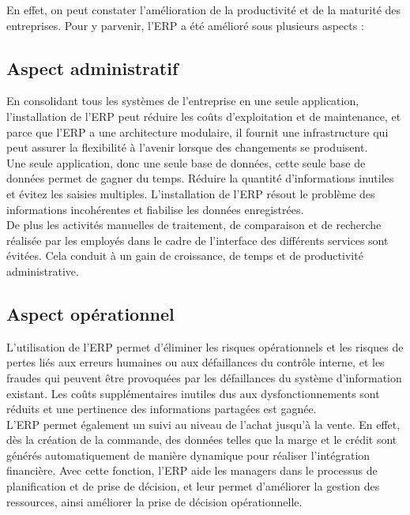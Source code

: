 En effet, on peut constater l'amélioration de la productivité et de la maturité des entreprises. Pour y parvenir, l'\acs{ERP} a été amélioré sous plusieurs aspects\cite{aspects} : \\

\subsection{Aspect administratif}
En consolidant tous les systèmes de l'entreprise en une seule application, l'installation de l'\acs{ERP} peut réduire les coûts d'exploitation et de maintenance, et parce que l'\acs{ERP} a une architecture modulaire, il fournit une infrastructure qui peut assurer la flexibilité à l'avenir lorsque des changements se produisent.\\

Une seule application, donc une seule base de données, cette seule base de données permet de gagner du temps. Réduire la quantité d'informations inutiles et évitez les saisies multiples. L'installation de l'\acs{ERP} résout le problème des informations incohérentes et fiabilise les données enregistrées.\\

De plus les activités manuelles de traitement, de comparaison et de recherche réalisée par les employés dans le cadre de l'interface des différents services sont évitées. Cela conduit à un gain de croissance, de temps et de productivité administrative.\\ 

\subsection{Aspect opérationnel}
L'utilisation de l'\acs{ERP} permet d'éliminer les risques opérationnels et les risques de pertes liés aux erreurs humaines ou aux défaillances du contrôle interne, et les fraudes qui peuvent être provoquées par les défaillances du système d'information existant. Les coûts supplémentaires inutiles dus aux dysfonctionnements sont réduits et une pertinence des informations partagées est gagnée.\\

L'\acs{ERP} permet également un suivi au niveau de l'achat jusqu'à la vente. En effet, dès la création de la commande, des données telles que la marge et le crédit sont générés automatiquement de manière dynamique pour réaliser l'intégration financière. Avec cette fonction, l'\acs{ERP} aide les managers dans le processus de planification et de prise de décision, et leur permet d'améliorer la gestion des ressources, ainsi améliorer la prise de décision opérationnelle.\\

